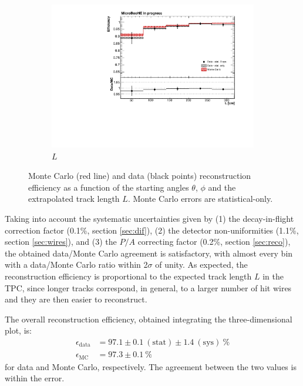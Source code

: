 \documentclass[a4paper]{scrartcl}
\begin{document}
\begin{figure}[htbp]
\begin{center}
\begin{subfigure}{0.6\textwidth}
      \includegraphics[width=\linewidth]{figures/l.pdf}
      \caption{$L$} \label{fig:l}
    \end{subfigure}
    \caption{Monte Carlo (red line) and data (black points) reconstruction efficiency as a function of the starting angles $\theta$, $\phi$ and the extrapolated track length $L$. Monte Carlo errors are statistical-only.}\label{fig:1d}
  \end{center}
\end{figure}

Taking into account the systematic uncertainties given by (1) the decay-in-flight correction factor (0.1\%, section \ref{sec:dif}), (2) the detector non-uniformities (1.1\%, section \ref{sec:wires}), and (3) the $P/A$ correcting factor (0.2\%, section \ref{sec:reco}), the obtained data/Monte Carlo agreement is satisfactory, with almost every bin with a data/Monte Carlo ratio within 2$\sigma$ of unity. As expected, the reconstruction efficiency is proportional to the expected track length $L$ in the TPC, since longer tracks correspond, in general, to a larger number of hit wires and they are then easier to reconstruct.

The overall reconstruction efficiency, obtained integrating the three-dimensional plot, is:
\begin{align*}
\epsilon_{\mathrm{data}} &= 97.1 \pm 0.1~\mathrm{(stat)} \pm 1.4~\mathrm{(sys)}~\%\\
\epsilon_{\mathrm{MC}} &= 97.3 \pm 0.1~\%
\end{align*} for data and Monte Carlo, respectively. The agreement between the two values is within the error.
\end{document}
